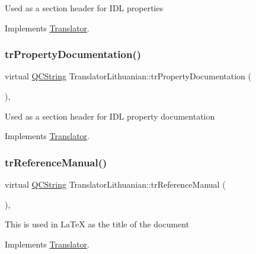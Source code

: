 Used as a section header for I\+DL properties 

Implements \mbox{\hyperlink{class_translator}{Translator}}.

\mbox{\label{class_translator_lithuanian_a744b143062d20cb1b4ebe7b54228d3a3}} 
\subsubsection{\texorpdfstring{trPropertyDocumentation()}{trPropertyDocumentation()}}
{\footnotesize\ttfamily virtual \mbox{\hyperlink{class_q_c_string}{Q\+C\+String}} Translator\+Lithuanian\+::tr\+Property\+Documentation (\begin{DoxyParamCaption}{ }\end{DoxyParamCaption})\hspace{0.3cm}{\ttfamily [inline]}, {\ttfamily [virtual]}}

Used as a section header for I\+DL property documentation 

Implements \mbox{\hyperlink{class_translator}{Translator}}.

\mbox{\label{class_translator_lithuanian_ad8dcfb0264d15263dd44434ddf39c6a5}} 
\subsubsection{\texorpdfstring{trReferenceManual()}{trReferenceManual()}}
{\footnotesize\ttfamily virtual \mbox{\hyperlink{class_q_c_string}{Q\+C\+String}} Translator\+Lithuanian\+::tr\+Reference\+Manual (\begin{DoxyParamCaption}{ }\end{DoxyParamCaption})\hspace{0.3cm}{\ttfamily [inline]}, {\ttfamily [virtual]}}

This is used in La\+TeX as the title of the document 

Implements \mbox{\hyperlink{class_translator}{Translator}}.

\mbox{\label{class_translator_lithuanian_ac972f4340306409b2533c3c2c207111f}} 
